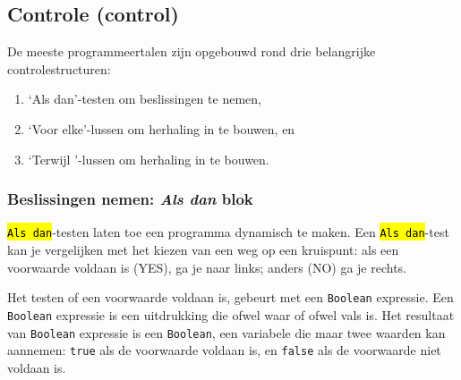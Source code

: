 \subsection{Controle (control)}
De meeste programmeertalen zijn opgebouwd rond drie belangrijke controlestructuren: 

\begin{enumerate}
	\item \textquoteleft Als dan\textquoteright-testen om beslissingen te nemen, 
	\item \textquoteleft Voor elke\textquoteright-lussen om herhaling in te bouwen, en
	\item  \textquoteleft Terwijl \textquoteright-lussen om herhaling in te bouwen.
\end{enumerate}

\subsubsection{Beslissingen nemen: \emph{Als dan} blok}

\begin{minipage}{.5\linewidth}
\end{minipage}
\begin{minipage}{.5\linewidth}
\end{minipage}

\hl{\texttt{Als dan}}-testen laten toe een programma dynamisch te maken. Een \hl{\texttt{Als dan}}-test kan je vergelijken met het kiezen van een weg op een kruispunt: als een voorwaarde voldaan is (YES), ga je naar links; anders (NO) ga je rechts. 

Het testen of een voorwaarde voldaan is, gebeurt met een \texttt{Boolean} expressie.
Een \texttt{Boolean} expressie is een uitdrukking die ofwel waar of ofwel vals is.
Het resultaat van \texttt{Boolean} expressie is een \texttt{Boolean}, een variabele die maar twee waarden kan aannemen: \texttt{true} als de voorwaarde voldaan is, en \texttt{false} als de voorwaarde niet voldaan is.

